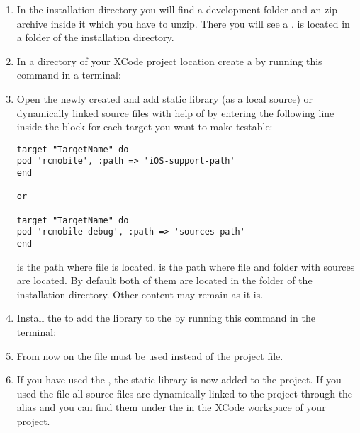 \begin{enumerate}
\item  In the installation directory you will find a development folder and an  zip archive inside it which you have to unzip.
There you will see a .  is located in a  folder of the installation directory.
\item In a directory of your \gdaut{} XCode project location create a   by running this command in a terminal:
\\
\item Open the newly created  and add  static library (as a local source) or dynamically linked source files with help of  by entering the following line inside the  block for each target you want to make testable:
\begin{verbatim}
target "TargetName" do
pod 'rcmobile', :path => 'iOS-support-path'
end

or 

target "TargetName" do
pod 'rcmobile-debug', :path => 'sources-path'
end
\end{verbatim}
 is the path where  file is located. 
 is the path where  file and folder with sources are located. By default both of them are located in the  folder of the installation directory.
Other  content may remain as it is.
\item Install the  to add the library to the \gdaut{} by running this command in the terminal: 
\\
\item From now on the  file must be used instead of the project file.
\item If you have used the , the static library is now added to the project. If you used the  file 
all source files are dynamically linked to the project through the alias and you can find them under the  in the XCode workspace of your project.
\end{enumerate}

